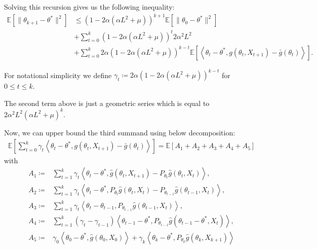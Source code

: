 \documentclass[a4paper]{article}
\newcommand{\norm}[1]{\|#1 \|}
\newcommand{\Exs}{\mathbb{E}}
\newcommand{\thetastar}{\theta^*}
\newcommand{\stepsize}{\alpha}
\begin{document}
Solving this recursion gives us the following inequality:
\begin{align*}
	\Exs\left[\norm{\theta_{k + 1} - \thetastar}^{2}\right] & \le \left(1 - 2\stepsize\left(\stepsize L^{2} + \mu\right)\right)^{k + 1}\Exs\left[\norm{\theta_{0} - \thetastar}^{2}\right] \\
	& + \sum_{t = 0}^{k}\left(1 - 2\stepsize\left(\stepsize L^{2} + \mu\right)\right)^{t}2\stepsize^{2}L^{2} \\
	& + \sum_{t = 0}^{k}2\stepsize\left(1 - 2\stepsize\left(\stepsize L^{2} + \mu\right)\right)^{k - t}\Exs\left[\left\langle \theta_{t} - \thetastar, g\left(\theta_{t}, X_{t + 1}\right) - \bar{g}\left(\theta_{t}\right) \right\rangle\right].
\end{align*}

For notational simplicity we define $\gamma_{t} \coloneq 2\stepsize\left(1 - 2\stepsize\left(\stepsize L^{2} + \mu\right)\right)^{k - t}$ for $0 \le t \le k$.

The second term above is just a geometric series which is equal to $2\stepsize^{2}L^{2}\left(\stepsize L^{2} + \mu\right)^{k}$.

Now, we can upper bound the third summand using below decomposition:
\begin{align*}
	\Exs\left[ \sum_{t = 0}^{k} \gamma_{t}\left\langle \theta_{t} - \thetastar, g(\theta_{t}, X_{t + 1}) - \bar{g}(\theta_{t}) \right\rangle \right] = \Exs\left[ A_{1} + A_{2} + A_{3} + A_{4} + A_{5}\right]
\end{align*}
with
\begin{align*}
	A_{1} \coloneq & \sum_{t = 1}^{k}\gamma_{t}\left\langle \theta_{t} - \thetastar, \hat{g}\left(\theta_{t}, X_{t + 1}\right) - P_{\theta_{t}}\hat{g}\left(\theta_{t}, X_{t}\right) \right\rangle,\\
	A_{2} \coloneq & \sum_{t = 1}^{k}\gamma_{t}\left\langle \theta_{t} - \thetastar, P_{\theta_{t}}\hat{g}\left(\theta_{t}, X_{t}\right) - P_{\theta_{t - 1}}\hat{g}\left( \theta_{t - 1}, X_{t} \right) \right\rangle,\\
	A_{3} \coloneq & \sum_{t = 1}^{k}\gamma_{t}\left\langle \theta_{t} - \theta_{t - 1}, P_{\theta_{t - 1}}\hat{g}\left( \theta_{t - 1}, X_{t}\right) \right\rangle,\\
	A_{4} \coloneq & \sum_{t = 1}^{k}\left(\gamma_{t} - \gamma_{t - 1}\right)\left\langle \theta_{t - 1} - \thetastar, P_{\theta_{t - 1}}\hat{g}\left( \theta_{t - 1} - \thetastar, X_{t}\right) \right\rangle,\\
	A_{5} \coloneq & \gamma_{0}\left\langle \theta_{0} - \thetastar, \hat{g}\left(\theta_{0}, X_{0}\right) \right\rangle + \gamma_{k}\left\langle \theta_{k} - \thetastar, P_{\theta_{k}}\hat{g}\left(\theta_{k}, X_{k + 1}\right)\right\rangle
\end{align*}
\end{document}
